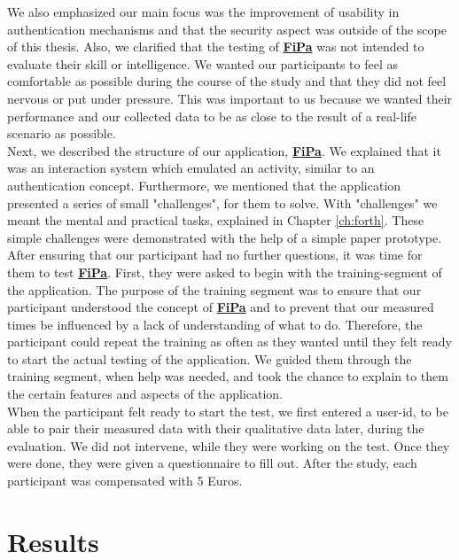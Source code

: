 We also emphasized our main focus was the improvement of usability in authentication mechanisms and that the security aspect was outside of the scope of this thesis. Also, we clarified that the testing of \underline{\textbf{FiPa}} was not intended to evaluate their skill or intelligence. We wanted our participants to feel as comfortable as possible during the course of the study and that they did not feel nervous or put under pressure. This was important to us because we wanted their performance and our collected data to be as close to the result of a real-life scenario as possible. \\

Next, we described the structure of our application, \underline{\textbf{FiPa}}. We explained that it was an interaction system which emulated an activity, similar to an authentication concept. Furthermore, we mentioned that the application presented a series of small "challenges", for them to solve. With "challenges" we meant the mental and practical tasks, explained in Chapter \ref{ch:forth}. These simple challenges were demonstrated with the help of a simple paper prototype.\\

After ensuring that our participant had no further questions, it was time for them to test \underline{\textbf{FiPa}}. First, they were asked to begin with the training-segment of the application. The purpose of the training segment was to ensure that our participant understood the concept of \underline{\textbf{FiPa}} and to prevent that our measured times be influenced by a lack of understanding of what to do. Therefore, the participant could repeat the training as often as they wanted until they felt ready to start the actual testing of the application. We guided them through the training segment, when help was needed, and took the chance to explain to them the certain features and aspects of the application. \\

When the participant felt ready to start the test, we first entered a user-id, to be able to pair their measured data with their qualitative data later, during the evaluation. We did not intervene, while they were working on the test. Once they were done, they were given a questionnaire to fill out. After the study, each participant was compensated with 5 Euros.

\section{Results}

